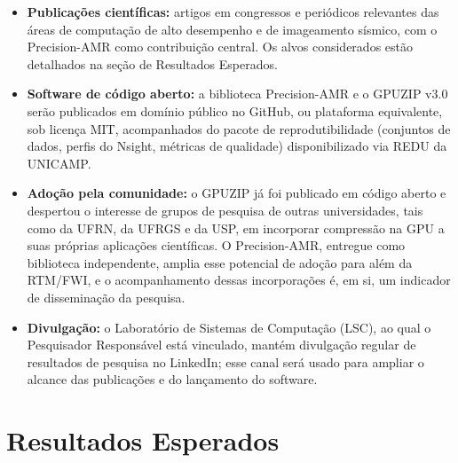 \documentclass[12pt,a4paper]{article}
\begin{document}
\begin{itemize}
  \item \textbf{Publicações científicas:} artigos em congressos e periódicos
        relevantes das áreas de computação de alto desempenho e de
        imageamento sísmico, com o Precision-AMR como contribuição central.
        Os alvos considerados estão detalhados na seção de Resultados
        Esperados.
  \item \textbf{Software de código aberto:} a biblioteca Precision-AMR e o
        GPUZIP v3.0 serão publicados em domínio público no GitHub, ou
        plataforma equivalente, sob licença MIT, acompanhados do pacote de
        reprodutibilidade (conjuntos de dados, perfis do Nsight, métricas de
        qualidade) disponibilizado via REDU da UNICAMP.
  \item \textbf{Adoção pela comunidade:} o GPUZIP já foi publicado em código
        aberto e despertou o interesse de grupos de pesquisa de outras universidades, tais como da UFRN, da
        UFRGS e da USP, em incorporar compressão na GPU a suas próprias
        aplicações científicas. O Precision-AMR, entregue como biblioteca
        independente, amplia esse potencial de adoção para além da RTM/FWI,
        e o acompanhamento dessas incorporações é, em si, um indicador de
        disseminação da pesquisa.
  \item \textbf{Divulgação:} o Laboratório de Sistemas de Computação (LSC),
        ao qual o Pesquisador Responsável está vinculado, mantém divulgação
        regular de resultados de pesquisa no LinkedIn; esse canal será usado
        para ampliar o alcance das publicações e do lançamento do software.
\end{itemize}

\iffalse

\section{Resultados Esperados}
\end{document}
